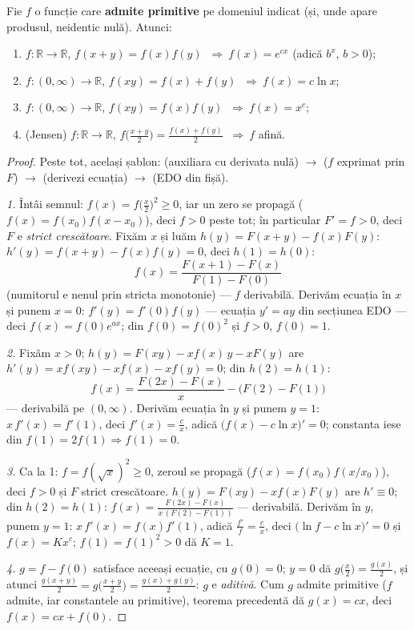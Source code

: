 \begin{teorema}
Fie $f$ o funcție care \textbf{admite primitive} pe domeniul indicat (și, unde apare produsul, neidentic nulă). Atunci:
\begin{enumerate}[leftmargin=*, itemsep=2pt]
\item $f:\mathbb{R}\to\mathbb{R}$, $f(x+y)=f(x)f(y)$ $\ \Rightarrow\ f(x)=e^{cx}$ (adică $b^{x}$, $b>0$);
\item $f:(0,\infty)\to\mathbb{R}$, $f(xy)=f(x)+f(y)$ $\ \Rightarrow\ f(x)=c\ln x$;
\item $f:(0,\infty)\to\mathbb{R}$, $f(xy)=f(x)f(y)$ $\ \Rightarrow\ f(x)=x^{c}$;
\item (Jensen) $f:\mathbb{R}\to\mathbb{R}$, $f\big(\frac{x+y}{2}\big)=\frac{f(x)+f(y)}{2}$ $\ \Rightarrow\ f$ afină.
\end{enumerate}
\end{teorema}
\begin{proof}
Peste tot, același șablon: (auxiliara cu derivata nulă) $\to$ ($f$ exprimat prin $F$) $\to$ (derivezi ecuația) $\to$ (EDO din fișă).

\emph{1.} Întâi semnul: $f(x)=f\big(\frac x2\big)^2\ge0$, iar un zero se propagă ($f(x)=f(x_0)f(x-x_0)$), deci $f>0$ peste tot; în particular $F'=f>0$, deci $F$ e \emph{strict crescătoare}. Fixăm $x$ și luăm $h(y)=F(x+y)-f(x)F(y)$: $h'(y)=f(x+y)-f(x)f(y)=0$, deci $h(1)=h(0)$:
\[
f(x)=\frac{F(x+1)-F(x)}{F(1)-F(0)}
\]
(numitorul e nenul prin stricta monotonie) --- $f$ derivabilă. Derivăm ecuația în $x$ și punem $x=0$: $f'(y)=f'(0)f(y)$ --- ecuația $y'=ay$ din secțiunea EDO --- deci $f(x)=f(0)e^{ax}$; din $f(0)=f(0)^2$ și $f>0$, $f(0)=1$.

\emph{2.} Fixăm $x>0$; $h(y)=F(xy)-x f(x)\,y-x F(y)$ are $h'(y)=xf(xy)-xf(x)-xf(y)=0$; din $h(2)=h(1)$:
\[
f(x)=\frac{F(2x)-F(x)}{x}-\big(F(2)-F(1)\big)
\]
--- derivabilă pe $(0,\infty)$. Derivăm ecuația în $y$ și punem $y=1$: $x\,f'(x)=f'(1)$, deci $f'(x)=\frac cx$, adică $\big(f(x)-c\ln x\big)'=0$; constanta iese din $f(1)=2f(1)\Rightarrow f(1)=0$.

\emph{3.} Ca la 1: $f=f(\sqrt x)^2\ge0$, zeroul se propagă ($f(x)=f(x_0)f(x/x_0)$), deci $f>0$ și $F$ strict crescătoare. $h(y)=F(xy)-xf(x)F(y)$ are $h'\equiv0$; din $h(2)=h(1)$: $f(x)=\frac{F(2x)-F(x)}{x\,(F(2)-F(1))}$ --- derivabilă. Derivăm în $y$, punem $y=1$: $x\,f'(x)=f(x)f'(1)$, adică $\frac{f'}{f}=\frac cx$, deci $\big(\ln f-c\ln x\big)'=0$ și $f(x)=Kx^c$; $f(1)=f(1)^2>0$ dă $K=1$.

\emph{4.} $g=f-f(0)$ satisface aceeași ecuație, cu $g(0)=0$; $y=0$ dă $g\big(\frac x2\big)=\frac{g(x)}2$, și atunci $\frac{g(x+y)}{2}=g\big(\frac{x+y}{2}\big)=\frac{g(x)+g(y)}{2}$: $g$ e \emph{aditivă}. Cum $g$ admite primitive ($f$ admite, iar constantele au primitive), teorema precedentă dă $g(x)=cx$, deci $f(x)=cx+f(0)$.
\end{proof}

